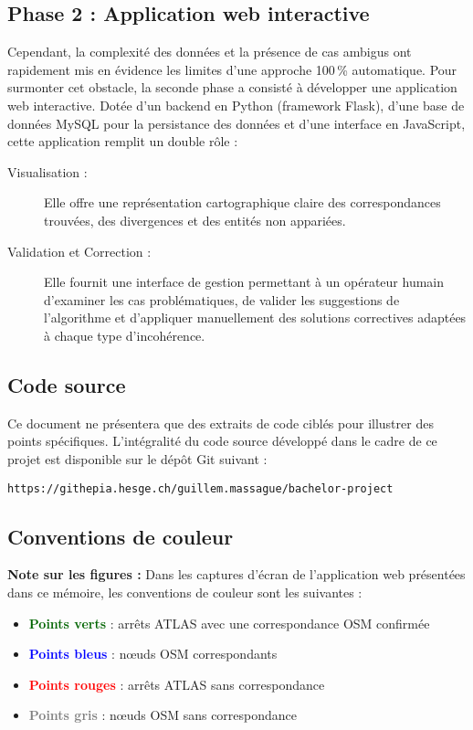 \subsection*{Phase 2 : Application web interactive}

Cependant, la complexité des données et la présence de cas ambigus ont rapidement mis en évidence les limites d'une approche 100\,\% automatique. Pour surmonter cet obstacle, la seconde phase a consisté à développer une application web interactive. Dotée d'un backend en Python (framework Flask), d'une base de données MySQL pour la persistance des données et d'une interface en JavaScript, cette application remplit un double rôle :

\begin{description}
    \item[Visualisation :] Elle offre une représentation cartographique claire des correspondances trouvées, des divergences et des entités non appariées.
    
    \item[Validation et Correction :] Elle fournit une interface de gestion permettant à un opérateur humain d'examiner les cas problématiques, de valider les suggestions de l'algorithme et d'appliquer manuellement des solutions correctives adaptées à chaque type d'incohérence.
\end{description}

\subsection*{Code source}

Ce document ne présentera que des extraits de code ciblés pour illustrer des points spécifiques. L'intégralité du code source développé dans le cadre de ce projet est disponible sur le dépôt Git suivant : 

\begin{center}
\texttt{https://githepia.hesge.ch/guillem.massague/bachelor-project}
\end{center}

\subsection*{Conventions de couleur}

\textbf{Note sur les figures :} Dans les captures d'écran de l'application web présentées dans ce mémoire, les conventions de couleur sont les suivantes :
\begin{itemize}
    \item \textcolor{darkgreen}{\textbf{Points verts}} : arrêts ATLAS avec une correspondance OSM confirmée
    \item \textcolor{blue}{\textbf{Points bleus}} : nœuds OSM correspondants
    \item \textcolor{red}{\textbf{Points rouges}} : arrêts ATLAS sans correspondance
    \item \textcolor{gray}{\textbf{Points gris}} : nœuds OSM sans correspondance
\end{itemize}

